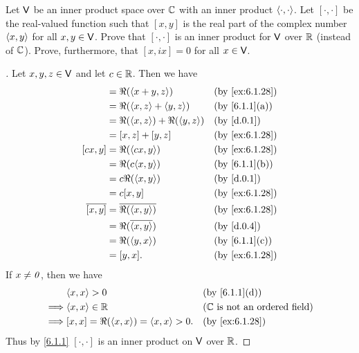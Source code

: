 \begin{ex}\label{ex:6.1.28}
  Let \(\mathsf{V}\) be an inner product space over \(\mathbb{C}\) with an inner product \(\left\langle\cdot, \cdot\right\rangle\).
  Let \([\cdot, \cdot]\) be the real-valued function such that \([x, y]\) is the real part of the complex number \(\left\langle x, y\right\rangle\) for all \(x, y \in \mathsf{V}\).
  Prove that \([\cdot, \cdot]\) is an inner product for \(\mathsf{V}\) over \(\mathbb{R}\) (instead of \(\mathbb{C}\)).
  Prove, furthermore, that \([x, ix] = 0\) for all \(x \in \mathsf{V}\).
\end{ex}

\begin{proof}[]
  Let \(x, y, z \in \mathsf{V}\) and let \(c \in \mathbb{R}\).
  Then we have
  \begin{align*}
    [x + y, z]    & = \Re(\inn{x + y, z})               &  & \text{(by \cref{ex:6.1.28})} \\
                  & = \Re(\inn{x, z} + \inn{y, z})      &  & \text{(by \cref{6.1.1}(a))}  \\
                  & = \Re(\inn{x, z}) + \Re(\inn{y, z}) &  & \text{(by \cref{d.0.1})}     \\
                  & = [x, z] + [y, z]                   &  & \text{(by \cref{ex:6.1.28})} \\
    [cx, y]       & = \Re(\inn{cx, y})                  &  & \text{(by \cref{ex:6.1.28})} \\
                  & = \Re(c \inn{x, y})                 &  & \text{(by \cref{6.1.1}(b))}  \\
                  & = c \Re(\inn{x, y})                 &  & \text{(by \cref{d.0.1})}     \\
                  & = c [x, y]                          &  & \text{(by \cref{ex:6.1.28})} \\
    \conj{[x, y]} & = \conj{\Re(\inn{x, y})}            &  & \text{(by \cref{ex:6.1.28})} \\
                  & = \Re(\conj{\inn{x, y}})            &  & \text{(by \cref{d.0.4})}     \\
                  & = \Re(\inn{y, x})                   &  & \text{(by \cref{6.1.1}(c))}  \\
                  & = [y, x].                           &  & \text{(by \cref{ex:6.1.28})}
  \end{align*}
  If \(x \neq \mathit{0}\), then we have
  \begin{align*}
             & \inn{x, x} > 0                             &  & \text{(by \cref{6.1.1}(d))}             \\
    \implies & \inn{x, x} \in \R                          &  & \text{(\(\C\) is not an ordered field)} \\
    \implies & [x, x] = \Re(\inn{x, x}) = \inn{x, x} > 0. &  & \text{(by \cref{ex:6.1.28})}
  \end{align*}
  Thus by \cref{6.1.1} \([\cdot, \cdot]\) is an inner product on \(\mathsf{V}\) over \(\mathbb{R}\).


\end{proof}
